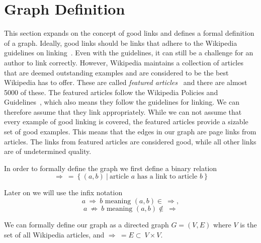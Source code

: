 \section{Graph Definition}
This section expands on the concept of good links and defines a formal definition of a graph. Ideally, good links should be links that adhere to the Wikipedia guidelines on linking~\cite{wiki-manual-of-style-guidelines}. Even with the guidelines, it can still be a challenge for an author to link correctly. However, Wikipedia maintains a collection of articles that are deemed outstanding examples and are considered to be the best Wikipedia has to offer. These are called \emph{featured articles}~\cite{wiki-featured-articles} and there are almost 5000 of these. The featured articles follow the Wikipedia Policies and Guidelines~\cite{wiki-editor-guidelines}, which also means they follow the guidelines for linking. We can therefore assume that they link appropriately. While we can not assume that every example of good linking is covered, the featured articles provide a sizable set of good examples. This means that the edges in our graph are page links from articles. The links from featured articles are considered good, while all other links are of undetermined quality.

In order to formally define the graph we first define a binary relation $$\Rightarrow\ =\ \{\ (a,b)\ |\ \text{article } a \text{ has a link to article } b\ \}$$

Later on we will use the infix notation $$a\ \Rightarrow\ b \text{ meaning } (a,b) \in\ \Rightarrow,$$ $$a\ \not\Rightarrow\ b \text{ meaning } (a,b) \not\in\ \Rightarrow$$

We can formally define our graph as a directed graph $G = (V,E)$ where $V$ is the set of all Wikipedia articles, and $\Rightarrow\ = E\subset\ V \times V$.

